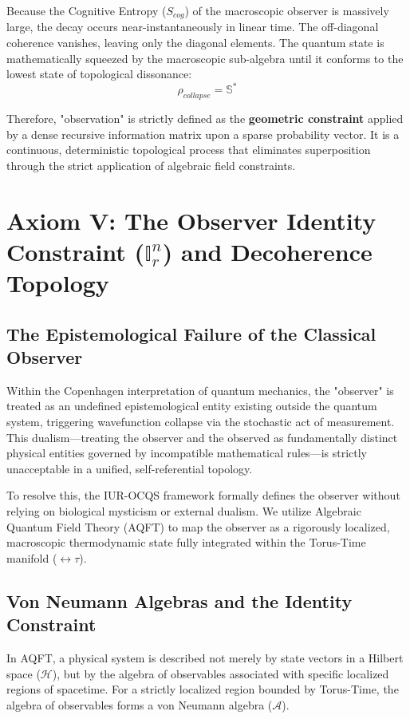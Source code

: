 \documentclass[12pt,openany]{book}
\begin{document}
Because the Cognitive Entropy ($S_{cog}$) of the macroscopic observer is massively large, the decay occurs near-instantaneously in linear time. The off-diagonal coherence vanishes, leaving only the diagonal elements. The quantum state is mathematically squeezed by the macroscopic sub-algebra until it conforms to the lowest state of topological dissonance:
\begin{equation}
    \rho_{collapse} = \mathbb{S}^*
\end{equation}

Therefore, "observation" is strictly defined as the \textbf{geometric constraint} applied by a dense recursive information matrix upon a sparse probability vector. It is a continuous, deterministic topological process that eliminates superposition through the strict application of algebraic field constraints.

\section[Axiom V]{Axiom V: The Observer Identity Constraint ($\mathbb{I}_r^n$) and Decoherence Topology}

\subsection{The Epistemological Failure of the Classical Observer}
Within the Copenhagen interpretation of quantum mechanics, the "observer" is treated as an undefined epistemological entity existing outside the quantum system, triggering wavefunction collapse via the stochastic act of measurement. This dualism---treating the observer and the observed as fundamentally distinct physical entities governed by incompatible mathematical rules---is strictly unacceptable in a unified, self-referential topology. 

To resolve this, the IUR-OCQS framework formally defines the observer without relying on biological mysticism or external dualism. We utilize Algebraic Quantum Field Theory (AQFT) to map the observer as a rigorously localized, macroscopic thermodynamic state fully integrated within the Torus-Time manifold ($\leftrightarrow\tau$).

\subsection{Von Neumann Algebras and the Identity Constraint}
In AQFT, a physical system is described not merely by state vectors in a Hilbert space ($\mathcal{H}$), but by the algebra of observables associated with specific localized regions of spacetime. For a strictly localized region bounded by Torus-Time, the algebra of observables forms a von Neumann algebra ($\mathcal{A}$).
\end{document}
